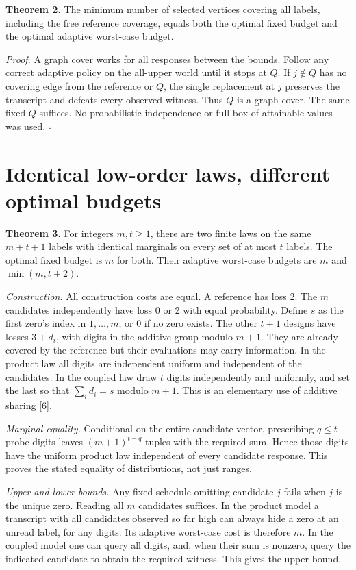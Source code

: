 \documentclass[11pt]{article}
\begin{document}
\textbf{Theorem 2.} The minimum number of selected vertices covering all labels, including the free reference coverage, equals both the optimal fixed budget and the optimal adaptive worst-case budget.

\emph{Proof.} A graph cover works for all responses between the bounds. Follow any correct adaptive policy on the all-upper world until it stops at \(Q\). If \(j\notin Q\) has no covering edge from the reference or \(Q\), the single replacement at \(j\) preserves the transcript and defeats every observed witness. Thus \(Q\) is a graph cover. The same fixed \(Q\) suffices. No probabilistic independence or full box of attainable values was used. \(\square\)

\newpage\section{Identical low-order laws, different optimal budgets}
\textbf{Theorem 3.} For integers \(m,t\geq1\), there are two finite laws on the same \(m+t+1\) labels with identical marginals on every set of at most \(t\) labels. The optimal fixed budget is \(m\) for both. Their adaptive worst-case budgets are \(m\) and \(\min(m,t+2)\).

\emph{Construction.} All construction costs are equal. A reference has loss 2. The \(m\) candidates independently have loss 0 or 2 with equal probability. Define \(s\) as the first zero's index in \(1,\ldots,m\), or 0 if no zero exists. The other \(t+1\) designs have losses \(3+d_i\), with digits in the additive group modulo \(m+1\). They are already covered by the reference but their evaluations may carry information. In the product law all digits are independent uniform and independent of the candidates. In the coupled law draw \(t\) digits independently and uniformly, and set the last so that \(\sum_i d_i=s\) modulo \(m+1\). This is an elementary use of additive sharing [6].

\emph{Marginal equality.} Conditional on the entire candidate vector, prescribing \(q\leq t\) probe digits leaves \((m+1)^{t-q}\) tuples with the required sum. Hence those digits have the uniform product law independent of every candidate response. This proves the stated equality of distributions, not just ranges.

\emph{Upper and lower bounds.} Any fixed schedule omitting candidate \(j\) fails when \(j\) is the unique zero. Reading all \(m\) candidates suffices. In the product model a transcript with all candidates observed so far high can always hide a zero at an unread label, for any digits. Its adaptive worst-case cost is therefore \(m\). In the coupled model one can query all digits, and, when their sum is nonzero, query the indicated candidate to obtain the required witness. This gives the upper bound.
\end{document}
